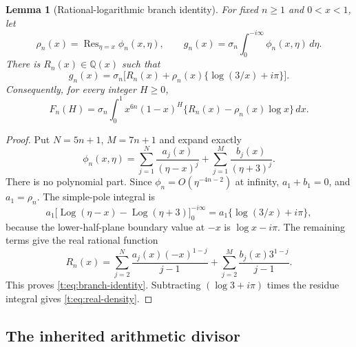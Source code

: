 \documentclass[11pt]{amsart}
\newcommand{\Log}{\operatorname{Log}}
\newcommand{\Q}{\mathbb Q}
\newcommand{\dd}{\,d}
\newcommand{\Res}{\operatorname{Res}}
\theoremstyle{plain}
\newtheorem{lemma}[theorem]{Lemma}
\theoremstyle{remark}\newtheorem{remark}[theorem]{Remark}
\numberwithin{equation}{section}
\begin{document}
\begin{lemma}[Rational-logarithmic branch identity]\label{t:lem:branch-identity}
For fixed $n\ge1$ and $0<x<1$, let
\[
 \rho_n(x)=\Res_{\eta=x}\phi_n(x,\eta),\qquad
 g_n(x)=\sigma_n\int_0^{-i\infty}\phi_n(x,\eta)\dd\eta.
\]
There is $R_n(x)\in\Q(x)$ such that
\begin{equation}\label{t:eq:branch-identity}
 g_n(x)=\sigma_n\bigl[R_n(x)+\rho_n(x)
       \{\log(3/x)+i\pi\}\bigr].
\end{equation}
Consequently, for every integer $H\ge0$,
\begin{equation}\label{t:eq:real-density}
 F_n(H)=\sigma_n\int_0^1x^{6n}(1-x)^H
       \{R_n(x)-\rho_n(x)\log x\}\dd x.
\end{equation}
\end{lemma}
\begin{proof}
Put $N=5n+1$, $M=7n+1$ and expand exactly
\[
 \phi_n(x,\eta)=\sum_{j=1}^{N}\frac{a_j(x)}{(\eta-x)^j}
              +\sum_{j=1}^{M}\frac{b_j(x)}{(\eta+3)^j}.
\]
There is no polynomial part. Since $\phi_n=O(\eta^{-4n-2})$ at infinity, $a_1+b_1=0$, and $a_1=\rho_n$.
The simple-pole integral is
\[
 a_1\bigl[\Log(\eta-x)-\Log(\eta+3)\bigr]_0^{-i\infty}
 =a_1\{\log(3/x)+i\pi\},
\]
because the lower-half-plane boundary value at $-x$ is $\log x-i\pi$. The remaining terms give the real rational function
\[
 R_n(x)=\sum_{j=2}^{N}\frac{a_j(x)(-x)^{1-j}}{j-1}
       +\sum_{j=2}^{M}\frac{b_j(x)3^{1-j}}{j-1}.
\]
This proves \eqref{t:eq:branch-identity}. Subtracting $(\log3+i\pi)$ times the residue integral gives \eqref{t:eq:real-density}.
\end{proof}

\subsection{The inherited arithmetic divisor}\label{t:sec:arithmetic}
\end{document}
